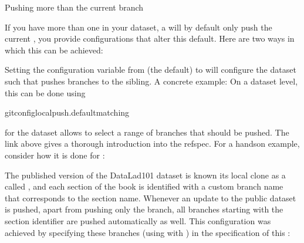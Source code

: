\ignorespaces \begin{findoutmore}[label={fom-push-branch}, before title={\thetcbcounter\ }, float, check odd page=true]{Pushing more than the current branch}
\label{\detokenize{basics/101-141-push:fom-push-branch}}

\sphinxAtStartPar
If you have more than one {\hyperref[\detokenize{glossary:term-branch}]{}} in your
dataset, a  will by default only push
the current {\hyperref[\detokenize{glossary:term-branch}]{}},  you provide configurations that alter
this default. Here are two ways in which this can be achieved:

\sphinxAtStartPar
{} Setting the  configuration variable from
 (the default) to  will configure the dataset such that
 pushes  branches to the sibling.
A concrete example: On a dataset level, this can be done using

\begin{sphinxVerbatim}[commandchars=\\\{\}]
gitconfig\PYGZhy{}\PYGZhy{}localpush.defaultmatching
\end{sphinxVerbatim}

\sphinxAtStartPar
{}
 for the dataset allows to
select a range of branches that should be pushed. The link above gives a
thorough introduction into the refspec. For a hands\sphinxhyphen{}on example, consider how it is done for
:

\sphinxAtStartPar
The published version of the DataLad\sphinxhyphen{}101 dataset is known its local clone
as a {\hyperref[\detokenize{glossary:term-remote}]{}} called , and each section of the book is identified
with a custom branch name that corresponds to the section name. Whenever an
update to the public dataset is pushed, apart from pushing only the 
branch, all branches starting with the section identifier  are pushed
automatically as well. This configuration was achieved by specifying these branches
(using {\hyperref[\detokenize{glossary:term-globbing}]{}} with \sphinxcode{\sphinxupquote{*}}) in the  specification of this {\hyperref[\detokenize{glossary:term-remote}]{}}:


\end{findoutmore}

